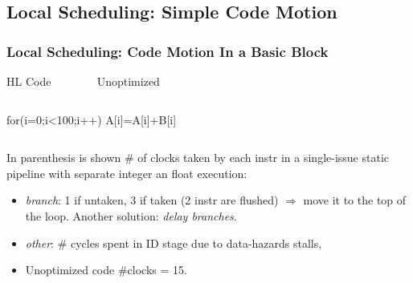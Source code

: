 \documentclass{beamer}
\begin{document}
\subsection{Local Scheduling: Simple Code Motion}
\begin{frame}[fragile,t]
    \frametitle{Local Scheduling: Code Motion In a Basic Block}

\begin{block}{HL Code{\tt~~~~~~~~}Unoptimized}\vspace{-2ex}
\begin{columns}
\begin{colorcode}[fontsize=\scriptsize]
for(i=0;i<100;i++)
  A[i]=A[i]+B[i]
\end{colorcode} 
\begin{colorcode}[fontsize=\scriptsize]

\end{colorcode} 
\end{columns}
\end{block}

In parenthesis is shown \# of clocks taken by each instr
in a single-issue static pipeline with separate integer an float 
execution:\smallskip
\begin{itemize}
    \item {\em branch}: 1 if untaken, 3 if taken (2 instr are flushed) $\Rightarrow$ 
            move it to the top of the loop.   Another solution: {\em delay branches}.
    \item {\em other}: \# cycles spent in ID stage due to data-hazards stalls,
    \item Unoptimized code \#clocks = 15.
\end  {itemize}

\end{frame}
\end{document}
